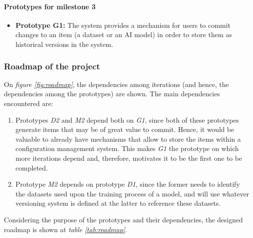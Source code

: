 \paragraph{Prototypes for milestone 3}

\begin{itemize}
    \item \textbf{Prototype G1: }The system provides a mechanism for users to commit changes to an item (a dataset or an AI model) in order to store them as historical versions in the system.
\end{itemize}

\subsubsection{Roadmap of the project}

On \emph{figure \ref{fig:roadmap}}, the dependencies among iterations (and hence, the dependencies among the prototypes) are shown. The main dependencies encountered are:

\begin{enumerate}
    \item Prototypes \emph{D2} and \emph{M2} depend both on \emph{G1}, since both of these prototypes generate items that may be of great value to commit. Hence, it would be valuable 
    to already have mechanisms that allow to store the items within a configuration management system. This makes \emph{G1} the prototype on which more iterations depend and, therefore,
    motivates it to be the first one to be completed.

    \item Prototype \emph{M2} depends on prototype \emph{D1}, since the former needs to identify the datasets used upon the training process of a model, and will use whatever versioning
    system is defined at the latter to reference these datasets.
\end{enumerate}

Considering the purpose of the prototypes and their dependencies, the designed roadmap is shown at \emph{table \ref{tab:roadmap}}.


